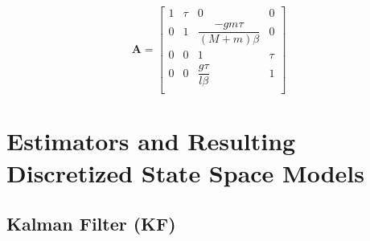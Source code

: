 \documentclass{article}
\newcommand{\matr}[1]{\bm{#1}}     %
\begin{document}
\begin{equation}
\matr{A} = 
\begin{bmatrix}
	1 & \tau & 0 & 0 \\
	0 & 1 & \dfrac{-gm\tau}{(M+m)\beta} & 0 \\
	0 & 0 & 1 & \tau \\
	0 & 0 & \dfrac{g\tau}{l\beta} & 1 \\
\end{bmatrix}
\label{aMatrix}
\end{equation}

\section{Estimators and Resulting Discretized State Space Models}
\subsection{Kalman Filter (KF)}
\end{document}
